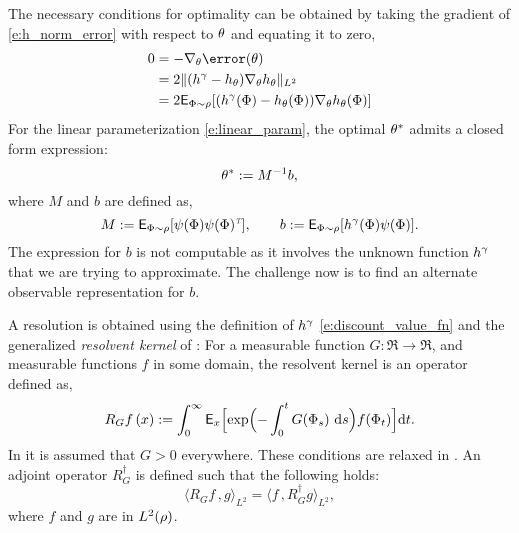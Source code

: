 The necessary conditions for optimality can be obtained by taking the gradient of \eqref{e:h_norm_error} with respect to $\theta$ and equating it to zero, 
\begin{equation}
\begin{aligned}
0 &= - \nabla_\param \error(\param)\\
& = 2 \|(h^\discount - h_\param) \nabla_\param h_\param \|_{L^2} \\
& = 2 \Expect_{\markovstate \sim \pr} [(h^\discount(\markovstate) - h_\param(\markovstate)) \nabla_\param h_\param(\markovstate)]
\end{aligned}
\end{equation} 
For the linear parameterization \eqref{e:linear_param}, the optimal $\theta^*$ admits a closed form expression:
\begin{equation}
\param^* := M^{-1} b,
\label{e:param_opt_lstd}
\end{equation}
where $M$ and $b$ are defined as,
\begin{equation}
M: = \Expect_{\markovstate \sim \pr} [\basis(\markovstate) \basis(\markovstate)^\transpose], \qquad b:= \Expect_{\markovstate \sim \pr} [h^\discount(\markovstate) \basis(\markovstate)].
\label{e:lstd_M_b}
\end{equation}
The expression for $b$ is not computable as it involves the unknown function $h^\gamma$ that we are trying to approximate. The challenge now is to find an alternate observable representation for $b$. 

A resolution is obtained using the definition of $h^\gamma$ \eqref{e:discount_value_fn} and the generalized \textit{resolvent kernel} of \cite{nev72,meytwe93e,devkonmey17a}: For a measurable function $G\colon\Re\to\Re$, and measurable functions $f$ in some domain, the resolvent kernel is an operator defined as,
\begin{equation}
R_G f\, (x) := \int_0^\infty \Expect_x\Bigl[ \exp\Bigl(-\int_0^t G(\markovstate_s)\, \rmd s \Bigr) f(\markovstate_t)\Bigr] \ud t.
\label{e:resolvent_neveu}
\end{equation}
In  \cite{nev72,meytwe93e} it is assumed that $G>0$ everywhere. These conditions are relaxed in \cite{konmey03a,devkonmey17a}. An adjoint operator $R^\dagger_G$ is defined such that the following holds:
\begin{equation}
\langle R_G f \, , g \rangle_{L^2} = \langle f \, , R^\dagger_G g \rangle_{L^2}, 
\label{e:RG_adjoint}
\end{equation}
where $f$ and $g$ are in $L^2(\rho)$. 

